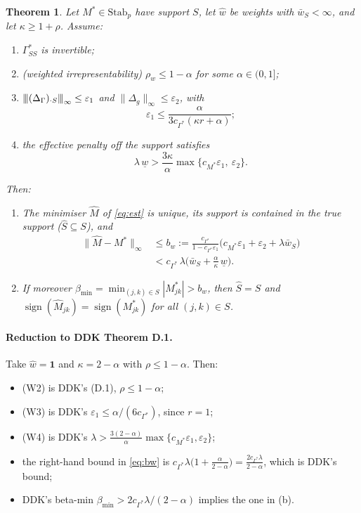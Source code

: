\documentclass[11pt,a4paper]{article}
\numberwithin{equation}{section}
\theoremstyle{plain}
\newtheorem{theorem}{Theorem}
\theoremstyle{remark}
\newcommand{\opnorm}[1]{{\vert\kern-0.25ex\vert\kern-0.25ex\vert #1 \vert\kern-0.25ex\vert\kern-0.25ex\vert}}
\DeclareMathOperator{\sign}{sign}
\begin{document}
\begin{theorem}\label{thm:W1}
Let $M^*\in\mathrm{Stab}_p$ have support $S$, let $\hat w$ be weights with $\bar w_S<\infty$, and let $\kappa\ge1+\rho$. Assume:
\begin{enumerate}[label=\upshape(W\arabic*),leftmargin=3.2em]
  \item $\Gamma^*_{SS}$ is invertible;
  \item (weighted irrepresentability) $\rho_w\le1-\alpha$ for some $\alpha\in(0,1]$;
  \item $\opnorm{(\Delta_\Gamma)_{\cdot S}}_\infty\le\varepsilon_1$ and $\|\Delta_g\|_\infty\le\varepsilon_2$, with
  \[
  \varepsilon_1\le\frac{\alpha}{3c_{\Gamma^*}(\kappa r+\alpha)};
  \]
  \item the effective penalty off the support satisfies
  \[
  \lambda\,\underline w>\frac{3\kappa}{\alpha}\max\{c_{M^*}\varepsilon_1,\ \varepsilon_2\}.
  \]
\end{enumerate}
Then:
\begin{enumerate}[label=\upshape\textbf{(\alph*)},leftmargin=2.5em]
  \item The minimiser $\hat M$ of \eqref{eq:est} is unique, its support is contained in the true support ($\hat S\subseteq S$), and
  \begin{equation}\label{eq:bw}
  \begin{split}
  \|\hat M-M^*\|_\infty&\le b_w:=\frac{c_{\Gamma^*}}{1-c_{\Gamma^*}\varepsilon_1}\big(c_{M^*}\varepsilon_1+\varepsilon_2+\lambda\bar w_S\big)\\
  &<c_{\Gamma^*}\,\lambda\Big(\bar w_S+\frac{\alpha}{\kappa}\,\underline w\Big).
  \end{split}
  \end{equation}
  \item If moreover $\beta_{\min}=\min_{(j,k)\in S}|M^*_{jk}|>b_w$, then $\hat S=S$ and $\sign(\hat M_{jk})=\sign(M^*_{jk})$ for all $(j,k)\in S$.
\end{enumerate}
\end{theorem}

\paragraph{Reduction to DDK Theorem D.1.} Take $\hat w=\textbf{1}$ and $\kappa=2-\alpha$ with $\rho\le1-\alpha$. Then:
\begin{itemize}
  \item (W2) is DDK's (D.1), $\rho\le1-\alpha$;
  \item (W3) is DDK's $\varepsilon_1\le\alpha/(6c_{\Gamma^*})$, since $r=1$;
  \item (W4) is DDK's $\lambda>\frac{3(2-\alpha)}{\alpha}\max\{c_{M^*}\varepsilon_1,\varepsilon_2\}$;
  \item the right-hand bound in \eqref{eq:bw} is $c_{\Gamma^*}\lambda\big(1+\frac{\alpha}{2-\alpha}\big)=\frac{2c_{\Gamma^*}\lambda}{2-\alpha}$, which is DDK's bound;
  \item DDK's beta-min $\beta_{\min}>2c_{\Gamma^*}\lambda/(2-\alpha)$ implies the one in (b).
\end{itemize}
\end{document}
